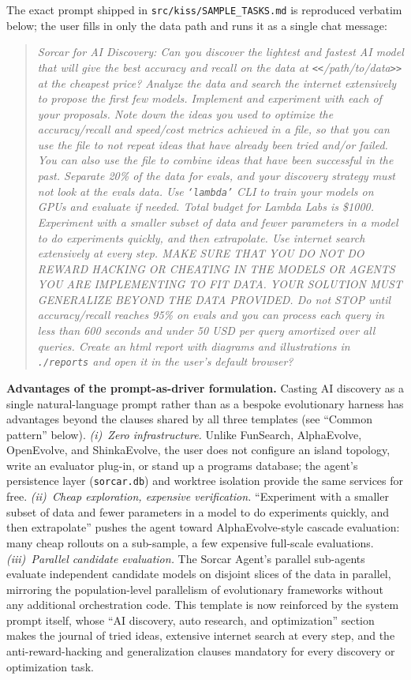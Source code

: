\documentclass{article}
\begin{document}
The exact prompt shipped in \texttt{src/kiss/SAMPLE\_TASKS.md} is reproduced verbatim below; the user fills in only the data path and runs it as a single chat message:

\begin{quote}\small\itshape
Sorcar for AI Discovery: Can you discover the lightest and fastest AI model that will give the best accuracy and recall on the data at \texttt{<\!<}/path/to/data\texttt{>\!>} at the cheapest price?  Analyze the data and search the internet extensively to propose the first few models.  Implement and experiment with each of your proposals.  Note down the ideas you used to optimize the accuracy/recall and speed/cost metrics achieved in a file, so that you can use the file to not repeat ideas that have already been tried and/or failed.  You can also use the file to combine ideas that have been successful in the past.  Separate 20\% of the data for evals, and your discovery strategy must not look at the evals data.  Use \texttt{`lambda'} CLI to train your models on GPUs and evaluate if needed.  Total budget for Lambda Labs is \$1000.  Experiment with a smaller subset of data and fewer parameters in a model to do experiments quickly, and then extrapolate.  Use internet search extensively at every step.  MAKE SURE THAT YOU DO NOT DO REWARD HACKING OR CHEATING IN THE MODELS OR AGENTS YOU ARE IMPLEMENTING TO FIT DATA.  YOUR SOLUTION MUST GENERALIZE BEYOND THE DATA PROVIDED.  Do not STOP until accuracy/recall reaches 95\% on evals and you can process each query in less than 600 seconds and under 50 USD per query amortized over all queries.  Create an html report with diagrams and illustrations in \texttt{./reports} and open it in the user's default browser?
\end{quote}

\textbf{Advantages of the prompt-as-driver formulation.}  Casting AI discovery as a single natural-language prompt rather than as a bespoke evolutionary harness has advantages beyond the clauses shared by all three templates (see ``Common pattern'' below).  \emph{(i)~Zero infrastructure.}  Unlike FunSearch, AlphaEvolve, OpenEvolve, and ShinkaEvolve, the user does not configure an island topology, write an evaluator plug-in, or stand up a programs database; the agent's persistence layer (\texttt{sorcar.db}) and worktree isolation provide the same services for free.  \emph{(ii)~Cheap exploration, expensive verification.}  ``Experiment with a smaller subset of data and fewer parameters in a model to do experiments quickly, and then extrapolate'' pushes the agent toward AlphaEvolve-style cascade evaluation: many cheap rollouts on a sub-sample, a few expensive full-scale evaluations.  \emph{(iii)~Parallel candidate evaluation.}  The Sorcar Agent's parallel sub-agents evaluate independent candidate models on disjoint slices of the data in parallel, mirroring the population-level parallelism of evolutionary frameworks without any additional orchestration code.  This template is now reinforced by the system prompt itself, whose ``AI discovery, auto research, and optimization'' section makes the journal of tried ideas, extensive internet search at every step, and the anti-reward-hacking and generalization clauses mandatory for every discovery or optimization task.
\end{document}

